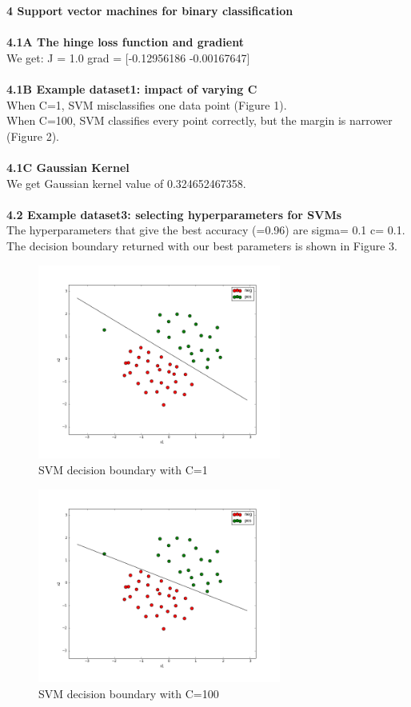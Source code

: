 \documentclass[12pt]{article}
\begin{document}
	\noindent \textbf{4 Support vector machines for binary classification} \\
	\\
	\noindent \textbf{4.1A The hinge loss function and gradient} \\
	\indent We get: J =  1.0  grad =  [-0.12956186 -0.00167647] \\
	\\
	\noindent \textbf{4.1B Example dataset1: impact of varying C}\\
	\indent When C=1, SVM misclassifies one data point (Figure 1).\\
	\indent When C=100, SVM classifies every point correctly, but the margin is narrower (Figure 2).\\
	\\
	\noindent \textbf{4.1C Gaussian Kernel}\\
	\indent We get Gaussian kernel value of 0.324652467358.\\
	\\
	\noindent \textbf{4.2 Example dataset3: selecting hyperparameters for SVMs}\\
	\indent The hyperparameters that give the best accuracy (=0.96) are sigma= 0.1 c= 0.1. \\
	\indent The decision boundary returned with our best parameters is shown in Figure 3.\\
	
	\begin{figure}[!tpb]
		\centerline{\includegraphics[width=80mm]{decision_boundary_c1.png}}
		\caption{\label{Fig1}
			SVM decision boundary with C=1}
	\end{figure}

	\begin{figure}[!tpb]
		\centerline{\includegraphics[width=80mm]{decision_boundary_c100.png}}
		\caption{\label{Fig2}
			SVM decision boundary with C=100}
	\end{figure}
\end{document}
